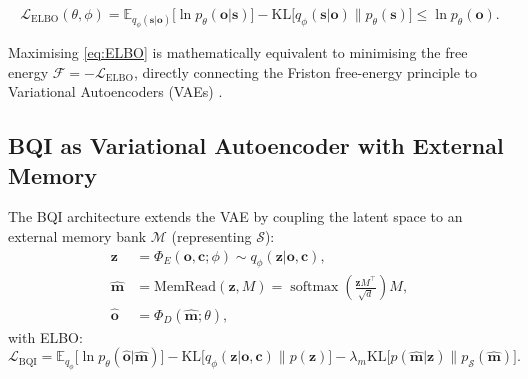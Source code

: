 \documentclass[12pt,a4paper]{article}
\theoremstyle{plain}
\theoremstyle{definition}
\theoremstyle{remark}
\newcommand{\vF}{\mathcal{F}}
\newcommand{\vS}{\mathcal{S}}
\newcommand{\BQI}{\mathrm{BQI}}
\newcommand{\KL}{\mathrm{KL}}
\newcommand{\E}{\mathbb{E}}
\newcommand{\softmax}{\operatorname{softmax}}
\newcommand{\SNIS}{\mathcal{S}}
\newcommand{\PhiE}{\Phi_E}
\newcommand{\PhiD}{\Phi_D}
\begin{document}
\begin{tcolorbox}[mathbox, title={ELBO — Neural Training Objective}]
\begin{equation}
\mathcal{L}_\mathrm{ELBO}(\theta,\phi) =
\E_{q_\phi(\mathbf{s}|\mathbf{o})}\bigl[\ln p_\theta(\mathbf{o}|\mathbf{s})\bigr]
- \KL\bigl[q_\phi(\mathbf{s}|\mathbf{o})\|p_\theta(\mathbf{s})\bigr]
\le \ln p_\theta(\mathbf{o}).
\label{eq:ELBO}
\end{equation}
\end{tcolorbox}
Maximising \cref{eq:ELBO} is mathematically equivalent to minimising the free energy
$\vF = -\mathcal{L}_\mathrm{ELBO}$, directly connecting the Friston free-energy principle to Variational Autoencoders (VAEs) \citep{KingmaWelling2014}.

\subsection{BQI as Variational Autoencoder with External Memory}

The BQI architecture extends the VAE by coupling the latent space to an external memory
bank $\mathcal{M}$ (representing $\vS$):
\begin{align}
\mathbf{z} &= \PhiE(\mathbf{o},\mathbf{c};\phi)\sim q_\phi(\mathbf{z}|\mathbf{o},\mathbf{c}),\\
\hat{\mathbf{m}} &= \mathrm{MemRead}(\mathbf{z},M) = \softmax\!\left(\frac{\mathbf{z}M^\top}{\sqrt{d}}\right)M,\\
\hat{\mathbf{o}} &= \PhiD(\hat{\mathbf{m}};\theta),
\end{align}
with ELBO:
\begin{equation}
\mathcal{L}_\BQI = \E_{q_\phi}\bigl[\ln p_\theta(\hat{\mathbf{o}}|\hat{\mathbf{m}})\bigr]
- \KL\bigl[q_\phi(\mathbf{z}|\mathbf{o},\mathbf{c})\|p(\mathbf{z})\bigr]
- \lambda_m\KL\bigl[p(\hat{\mathbf{m}}|\mathbf{z})\|p_\SNIS(\hat{\mathbf{m}})\bigr].
\label{eq:BQI_ELBO}
\end{equation}
\end{document}
